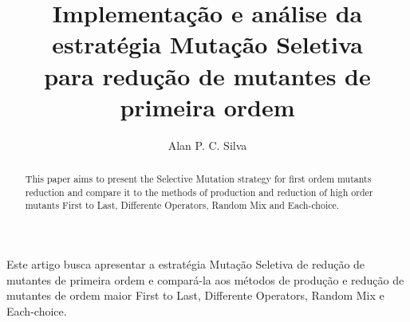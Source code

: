 \documentclass[12pt]{article}
\title{Implementação e análise da estratégia Mutação Seletiva\\para redução de mutantes de primeira ordem}
\author{Alan P. C. Silva\inst{1}}
\begin{document}
 

\maketitle

\begin{abstract}
  This paper aims to present the Selective Mutation strategy for first ordem 
  mutants reduction and compare it to the methods of production and reduction 
  of high order mutants First to Last, Differente Operators, Random Mix and 
  Each-choice.
\end{abstract}
     
\begin{resumo} 
  Este artigo busca apresentar a estratégia Mutação Seletiva de redução de 
  mutantes de primeira ordem e compará-la aos métodos de produção e redução de 
  mutantes de ordem maior First to Last, Differente Operators, Random Mix e
  Each-choice.
\end{resumo}










\end{document}

